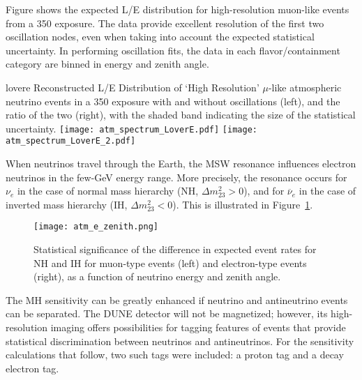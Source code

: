 Figure shows the expected L/E distribution for high-resolution muon-like 
events from a \SI{350}{\ktyr} exposure. The data provide excellent resolution of the 
first two oscillation nodes, even when taking into account the expected statistical uncertainty.
In performing oscillation fits, the data in each flavor/containment category are 
binned in energy and zenith angle. 

\begin{cdrfigure}{lovere}
{Reconstructed L/E Distribution of `High Resolution'
$\mu$-like atmospheric neutrino events in a \SI{350}{\ktyr} exposure with and
without oscillations (left), and the ratio of the two (right), with the
shaded band indicating the size of the statistical uncertainty.}
\texttt{[image: atm\_spectrum\_LoverE.pdf]}
\texttt{[image: atm\_spectrum\_LoverE\_2.pdf]}
\end{cdrfigure}

When neutrinos travel through the Earth, the MSW resonance influences 
electron neutrinos in the few-GeV energy range. More precisely, the resonance 
occurs for $\nu_e$ in the case of normal mass hierarchy (NH, $\Delta m^2_{23} > 0$), and for 
$\overline{\nu}_e$ in the case of inverted mass hierarchy (IH, $\Delta m^2_{23} < 0$). This is 
illustrated in Figure~\ref{fig:atm_e_zenith}. 

\begin{figure}[!htb]
\centering
\texttt{[image: atm\_e\_zenith.png]}
\caption[Zenith Angle vs. Energy For Atmospheric Neutrinos]
{Statistical significance of the difference in expected event rates for NH and IH for 
muon-type events (left) and electron-type events (right), as a function of neutrino
energy and zenith angle.}
\label{fig:atm_e_zenith}
\end{figure}

The MH sensitivity can be greatly enhanced if neutrino and antineutrino events can be 
separated. The DUNE detector will not be magnetized; however, its high-resolution 
imaging offers possibilities for tagging features of events that provide statistical 
discrimination between neutrinos and antineutrinos. For the sensitivity calculations 
that follow, two such tags were included: a proton tag and a decay electron tag. 


